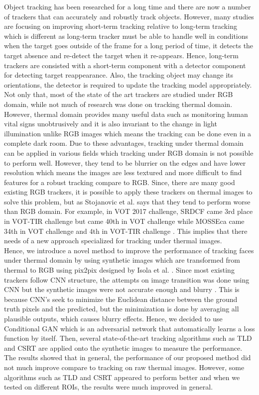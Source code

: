 \documentclass[conference]{IEEEtran}
\begin{document}
Object tracking has been researched for a long time and there are now a number of trackers that can accurately and robustly track objects. However, many studies are focusing on improving short-term tracking relative to long-term tracking which is different as long-term tracker must be able to handle well in conditions when the target goes outside of the frame for a long period of time, it detects the target absence and re-detect the target when it re-appears. Hence, long-term trackers are consisted with a short-term component with a detector component for detecting target reappearance\cite{b12}. Also, the tracking object may change its orientations, the detector is required to update the tracking model appropriately. Not only that, most of the state of the art trackers are studied under RGB domain, while not much of research was done on tracking thermal domain. However, thermal domain provides many useful data such as monitoring human vital signs unobtrusively and it is also invariant to the change in light illumination unlike RGB images which means the tracking can be done even in a complete dark room. Due to these advantages, tracking under thermal domain can be applied in various fields which tracking under RGB domain is not possible to perform well. However, they tend to be blurrier on the edges and have lower resolution which means the images are less textured and more difficult to find features for a robust tracking compare to RGB\cite{b3}. Since, there are many good existing RGB trackers, it is possible to apply these trackers on thermal images to solve this problem, but as Stojanovic et al.\cite{b10} says that they tend to perform worse than RGB domain. For example, in VOT 2017 challenge, SRDCF came 3rd place in VOT-TIR challenge but came 40th in VOT challenge while MOSSEca came 34th in VOT challenge and 4th in VOT-TIR challenge \cite{b11}. This implies that there needs of a new approach specialized for tracking under thermal images.\\ Hence, we introduce a novel method to improve the performance of tracking faces under thermal domain by using synthetic images which are transformed from thermal to RGB using pix2pix designed by Isola et al. \cite{b1}. Since most existing trackers follow CNN structure, the attempts on image transition was done using CNN but the synthetic images were not accurate enough and blurry \cite{b1}. This is because CNN’s seek to minimize the Euclidean distance between the ground truth pixels and the predicted, but the minimization is done by averaging all plausible outputs, which causes blurry effects. Hence, we decided to use Conditional GAN which is an adversarial network that automatically learns a loss function by itself. Then, several state-of-the-art tracking algorithms such as TLD\cite{b9} and CSRT are applied onto the synthetic images to measure the performance. The results showed that in general, the performance of our proposed method did not much improve compare to tracking on raw thermal images. However, some algorithms such as TLD and CSRT appeared to perform better and when we tested on different ROIs, the results were much improved in general. 
\end{document}
